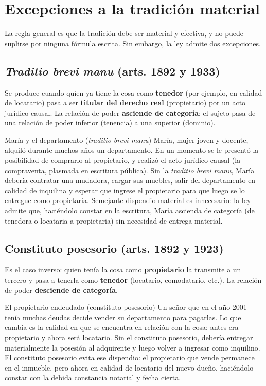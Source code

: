 \documentclass[12pt,oneside]{book}
\begin{document}
\section{Excepciones a la tradición material}

La regla general es que la tradición debe ser material y efectiva, y no puede suplirse por ninguna fórmula escrita. Sin embargo, la ley admite dos excepciones.

\subsection{\textit{Traditio brevi manu} (arts. 1892 y 1933)}

Se produce cuando quien ya tiene la cosa como \textbf{tenedor} (por ejemplo, en calidad de locatario) pasa a ser \textbf{titular del derecho real} (propietario) por un acto jurídico causal. La relación de poder \textbf{asciende de categoría}: el sujeto pasa de una relación de poder inferior (tenencia) a una superior (dominio).

\begin{example}{María y el departamento (\textit{traditio brevi manu})}
María, mujer joven y docente, alquiló durante muchos años un departamento. En un momento se le presentó la posibilidad de comprarlo al propietario, y realizó el acto jurídico causal (la compraventa, plasmada en escritura pública). Sin la \textit{traditio brevi manu}, María debería contratar una mudadora, cargar sus muebles, salir del departamento en calidad de inquilina y esperar que ingrese el propietario para que luego se lo entregue como propietaria. Semejante dispendio material es innecesario: la ley admite que, haciéndolo constar en la escritura, María ascienda de categoría (de tenedora o locataria a propietaria) sin necesidad de entrega material.
\end{example}

\subsection{Constituto posesorio (arts. 1892 y 1923)}

Es el caso inverso: quien tenía la cosa como \textbf{propietario} la transmite a un tercero y pasa a tenerla como \textbf{tenedor} (locatario, comodatario, etc.). La relación de poder \textbf{desciende de categoría}.

\begin{example}{El propietario endeudado (constituto posesorio)}
Un señor que en el año 2001 tenía muchas deudas decide vender su departamento para pagarlas. Lo que cambia es la calidad en que se encuentra en relación con la cosa: antes era propietario y ahora será locatario. Sin el constituto posesorio, debería entregar materialmente la posesión al adquirente y luego volver a ingresar como inquilino. El constituto posesorio evita ese dispendio: el propietario que vende permanece en el inmueble, pero ahora en calidad de locatario del nuevo dueño, haciéndolo constar con la debida constancia notarial y fecha cierta.
\end{example}
\end{document}

